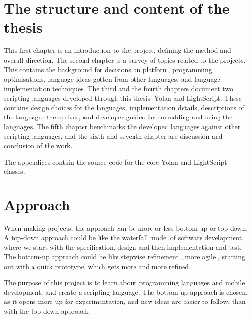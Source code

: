 \documentclass[11pt]{report}
\begin{document}
\begin{comment}
From a personal point of view, 
I would like to get started on development for mobile devices, 
and would also like to brush up on programming language implementation.
Design and implementation of a scripting language for mobile devices is spot on this topic.
\end{comment}


\section{The structure and content of the thesis}

This first chapter is an introduction to the project, defining the method and overall direction. 
The second chapter is a survey of topics related to the projects. This contains the background for decisions on platform, programming optimisations, language ideas gotten from other languages, and language implementation techniques.
The third and the fourth chapters document two scripting languages developed through this thesis: Yolan and LightScript. These contains design choices for the languages, implementation details, descriptions of the languages themselves, and developer guides for embedding and using the languages.
The fifth chapter benchmarks the developed languages against other scripting languages,
and the sixth and seventh chapter are discussion and conclusion of the work.

The appendices contain the source code for the core Yolan and LightScript classes.

\section{Approach}
\label{method}

When making projects, the approach can be
more or less bottom-up or top-down.
A top-down approach could be like the waterfall model \cite{waterfall} of software development,
where we start with the specification, design and then implementation and test.
The bottom-up approach could be like stepwise refinement \cite{stepwise-refinement}, more agile \cite{agile-manifesto, extreme-programming}, starting out with a quick prototype, which gets more and more refined.

The purpose of this project is to learn about programming languages and mobile development, and create a scripting language. 
The bottom-up approach is chosen, as it opens more up for experimentation, and new ideas are easier to follow, than with the top-down approach.
\end{document}
